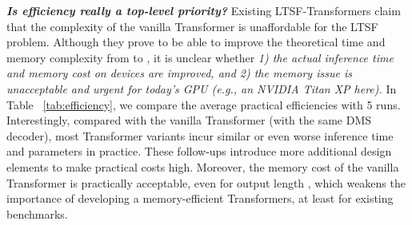 \documentclass[10pt,twocolumn,letterpaper]{article}
\begin{document}
\begin{table}[h]
\centering
{}
\vspace{-0.2cm}
\caption{The MSE comparison of two training data sizes.}
\vspace{-0.3cm}
\label{tab:shortenTraffic}
\end{table}


\textbf{\emph{Is efficiency really a top-level priority?}}
Existing LTSF-Transformers claim that the  complexity of the vanilla Transformer is unaffordable for the LTSF problem. Although they prove to be able to improve the theoretical time and memory complexity from  to , it is unclear whether \emph{1) the actual inference time and memory cost on devices are improved, and 2) the memory issue is unacceptable and urgent for today's GPU (e.g., an NVIDIA Titan XP here).}
In Table ~\ref{tab:efficiency}, we compare the average practical efficiencies with 5 runs. Interestingly, compared with the vanilla Transformer (with the same DMS decoder), most Transformer variants incur similar or even worse inference time and parameters in practice. These follow-ups introduce more additional design elements to make practical costs high. Moreover, the memory cost of the vanilla Transformer is practically acceptable, even for output length , which weakens the importance of developing a memory-efficient Transformers, at least for existing benchmarks. 
\end{document}
